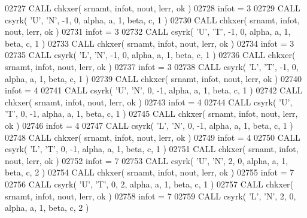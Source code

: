 \begin{DoxyCode}
02727       \textcolor{keyword}{CALL }chkxer( srnamt, infot, nout, lerr, ok )
02728       infot = 3
02729       \textcolor{keyword}{CALL }csyrk( \textcolor{stringliteral}{'U'}, \textcolor{stringliteral}{'N'}, -1, 0, alpha, a, 1, beta, c, 1 )
02730       \textcolor{keyword}{CALL }chkxer( srnamt, infot, nout, lerr, ok )
02731       infot = 3
02732       \textcolor{keyword}{CALL }csyrk( \textcolor{stringliteral}{'U'}, \textcolor{stringliteral}{'T'}, -1, 0, alpha, a, 1, beta, c, 1 )
02733       \textcolor{keyword}{CALL }chkxer( srnamt, infot, nout, lerr, ok )
02734       infot = 3
02735       \textcolor{keyword}{CALL }csyrk( \textcolor{stringliteral}{'L'}, \textcolor{stringliteral}{'N'}, -1, 0, alpha, a, 1, beta, c, 1 )
02736       \textcolor{keyword}{CALL }chkxer( srnamt, infot, nout, lerr, ok )
02737       infot = 3
02738       \textcolor{keyword}{CALL }csyrk( \textcolor{stringliteral}{'L'}, \textcolor{stringliteral}{'T'}, -1, 0, alpha, a, 1, beta, c, 1 )
02739       \textcolor{keyword}{CALL }chkxer( srnamt, infot, nout, lerr, ok )
02740       infot = 4
02741       \textcolor{keyword}{CALL }csyrk( \textcolor{stringliteral}{'U'}, \textcolor{stringliteral}{'N'}, 0, -1, alpha, a, 1, beta, c, 1 )
02742       \textcolor{keyword}{CALL }chkxer( srnamt, infot, nout, lerr, ok )
02743       infot = 4
02744       \textcolor{keyword}{CALL }csyrk( \textcolor{stringliteral}{'U'}, \textcolor{stringliteral}{'T'}, 0, -1, alpha, a, 1, beta, c, 1 )
02745       \textcolor{keyword}{CALL }chkxer( srnamt, infot, nout, lerr, ok )
02746       infot = 4
02747       \textcolor{keyword}{CALL }csyrk( \textcolor{stringliteral}{'L'}, \textcolor{stringliteral}{'N'}, 0, -1, alpha, a, 1, beta, c, 1 )
02748       \textcolor{keyword}{CALL }chkxer( srnamt, infot, nout, lerr, ok )
02749       infot = 4
02750       \textcolor{keyword}{CALL }csyrk( \textcolor{stringliteral}{'L'}, \textcolor{stringliteral}{'T'}, 0, -1, alpha, a, 1, beta, c, 1 )
02751       \textcolor{keyword}{CALL }chkxer( srnamt, infot, nout, lerr, ok )
02752       infot = 7
02753       \textcolor{keyword}{CALL }csyrk( \textcolor{stringliteral}{'U'}, \textcolor{stringliteral}{'N'}, 2, 0, alpha, a, 1, beta, c, 2 )
02754       \textcolor{keyword}{CALL }chkxer( srnamt, infot, nout, lerr, ok )
02755       infot = 7
02756       \textcolor{keyword}{CALL }csyrk( \textcolor{stringliteral}{'U'}, \textcolor{stringliteral}{'T'}, 0, 2, alpha, a, 1, beta, c, 1 )
02757       \textcolor{keyword}{CALL }chkxer( srnamt, infot, nout, lerr, ok )
02758       infot = 7
02759       \textcolor{keyword}{CALL }csyrk( \textcolor{stringliteral}{'L'}, \textcolor{stringliteral}{'N'}, 2, 0, alpha, a, 1, beta, c, 2 )

\end{DoxyCode}
